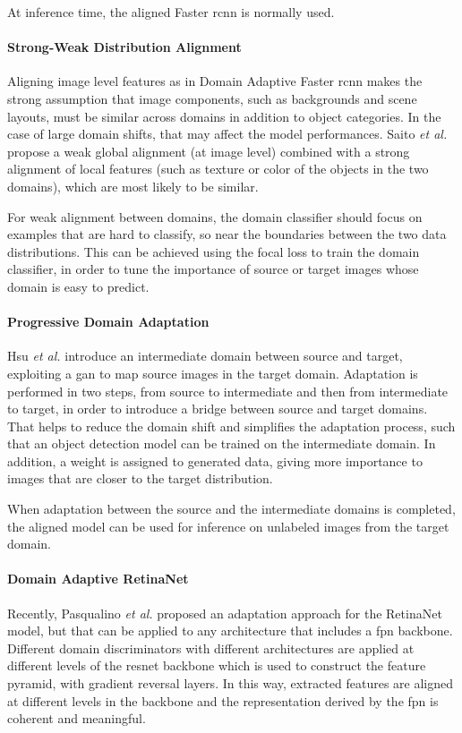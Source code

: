 \documentclass[%
    corpo=12pt,
    twoside,
    stile=classica,   
    tipotesi=magistrale,
    evenboxes,
    english,
	numerazioneromana,
]{toptesi}
\begin{document}
At inference time, the aligned Faster \gls{rcnn} is normally used.

\paragraph{Strong-Weak Distribution Alignment}
Aligning image level features as in Domain Adaptive Faster \gls{rcnn} makes the strong assumption that image components, such as backgrounds and scene layouts, must be similar across domains in addition to object categories. In the case of large domain shifts, that may affect the model performances. Saito \emph{et al.}\cite{saito2019strongweak} propose a weak global alignment (at image level) combined with a strong alignment of local features (such as texture or color of the objects in the two domains), which are most likely to be similar.

For weak alignment between domains, the domain classifier should focus on examples that are hard to classify, so near the boundaries between the two data distributions. This can be achieved using the focal loss to train the domain classifier, in order to tune the importance of source or target images whose domain is easy to predict.

\paragraph{Progressive Domain Adaptation}
Hsu \emph{et al.}\cite{hsu2019progressive} introduce an intermediate domain between source and target, exploiting a \gls{gan} to map source images in the target domain. Adaptation is performed in two steps, from source to intermediate and then from intermediate to target, in order to introduce a bridge between source and target domains. That helps to reduce the domain shift and simplifies the adaptation process, such that an object detection model can be trained on the intermediate domain. In addition, a weight is assigned to generated data, giving more importance to images that are closer to the target distribution.

When adaptation between the source and the intermediate domains is completed, the aligned model can be used for inference on unlabeled images from the target domain.

\paragraph{Domain Adaptive RetinaNet}\label{sec:daretinanet}
Recently, Pasqualino \emph{et al.}\cite{pasqualino2020unsupervised} proposed an adaptation approach for the RetinaNet model, but that can be applied to any architecture that includes a \gls{fpn} backbone. Different domain discriminators with different architectures are applied at different levels of the \gls{resnet} backbone which is used to construct the feature pyramid, with gradient reversal layers. In this way, extracted features are aligned at different levels in the backbone and the representation derived by the \gls{fpn} is coherent and meaningful.
\end{document}
